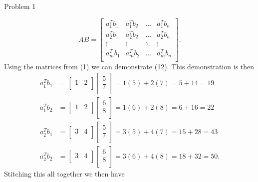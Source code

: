 \begin{problem}{Problem 1}
\begin{Highlight}[Solution]
        \begin{equation}
            AB = 
            \begin{bmatrix}
                a_{1}^{T}b_{1} & a_{1}^{T}b_{2} & \dots & a_{1}^{T}b_{n} \\
                a_{2}^{T}b_{1} & a_{2}^{T}b_{2} & \dots & a_{2}^{T}b_{n} \\
                \vdots & \vdots & \ddots & \vdots \\
                a_{m}^{T}b_{1} & a_{m}^{T}b_{2} & \dots & a_{m}^{T}b_{n} \\
            \end{bmatrix}.
        \end{equation}
        Using the matrices from (1) we can demonstrate (12). This demonstration is then
        \begin{align*}
            a_{1}^{T}b_{1} & = 
            \begin{bmatrix}
                1 & 2 \\
            \end{bmatrix}
            \begin{bmatrix}
                5 \\
                7 \\
            \end{bmatrix}
            = 1(5) + 2(7) = 5 + 14 = 19 \\
            a_{1}^{T}b_{2} & = 
            \begin{bmatrix}
                1 & 2 \\
            \end{bmatrix}
            \begin{bmatrix}
                6 \\
                8 \\
            \end{bmatrix}
            = 1(6) + 2(8) = 6 + 16 = 22 \\
            a_{2}^{T}b_{1} & = 
            \begin{bmatrix}
                3 & 4 \\
            \end{bmatrix}
            \begin{bmatrix}
                5 \\
                7 \\
            \end{bmatrix}
            = 3(5) + 4(7) = 15 + 28 = 43 \\
            a_{2}^{T}b_{2} & = 
            \begin{bmatrix}
                3 & 4 \\
            \end{bmatrix}
            \begin{bmatrix}
                6 \\
                8 \\
            \end{bmatrix}
            = 3(6) + 4(8) = 18 + 32 = 50.
        \end{align*}
        Stitching this all together we then have
        

\end{Highlight}
\end{problem}
